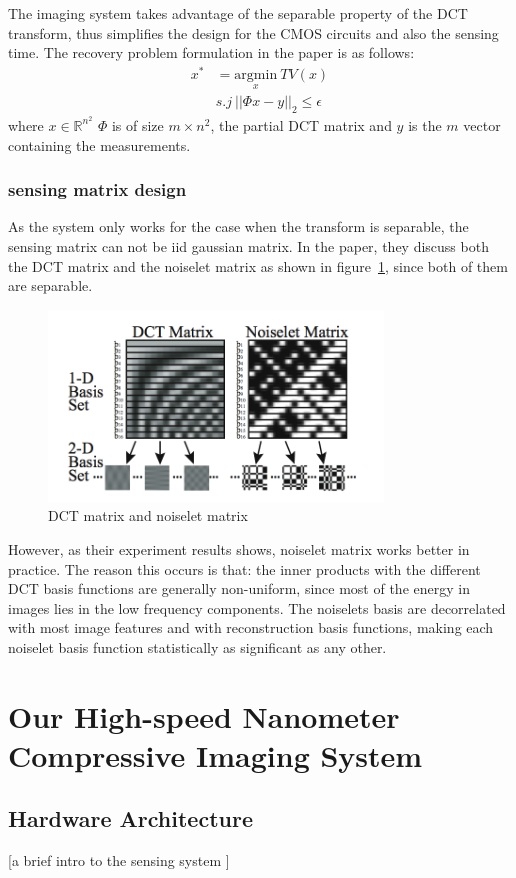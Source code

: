 \documentclass{article} %
\begin{document}
The imaging system takes advantage of the separable property of the DCT transform, thus simplifies the design for the CMOS circuits and also the sensing time. The recovery problem formulation in the paper is as follows:
\begin{align}
x^*&=\underset{x} {\mathrm{argmin}}~TV(x)\\
&s.j~||\Phi x - y||_2 \leq \epsilon
\end{align}
where $x \in \mathbb{R}^{n^2}$ $\Phi$ is of size $m \times n^2$, the partial DCT matrix and $y$ is the $m$ vector containing the measurements.
\subsubsection{sensing matrix design}
As the system only works for the case when the transform is separable, the sensing matrix can not be iid gaussian matrix. In the paper, they discuss both the DCT matrix and the noiselet matrix as shown in figure~\ref{fig:DCTnoiselet}, since both of them are separable. 
\begin{figure}[!h]
\centering
\includegraphics[width=3.5in]{DCTandNoiselet.png}
\caption{DCT matrix and noiselet matrix }
\label{fig:DCTnoiselet}
\end{figure}

However, as their experiment results shows, noiselet matrix works better in practice. The reason this occurs is that: the inner products with the different DCT basis functions are generally non-uniform, since most of the energy in images lies in the low frequency components. The noiselets basis are decorrelated with most image features and with reconstruction basis functions, making each noiselet basis function statistically as significant as any other.

\section{Our High-speed Nanometer Compressive Imaging System}
\subsection{Hardware Architecture}
[a brief intro to the sensing system ]
\end{document}
